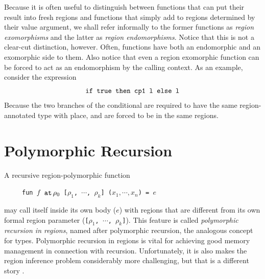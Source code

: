 \documentclass[12pt]{book}
\begin{document}
Because it is often useful to distinguish between functions that can
put their result into fresh regions and functions that simply add to
regions determined by their value argument, we shall refer informally
to the former functions as
%
{\em region exomorphisms} and the latter as
%
{\em region endomorphisms}. Notice that this is not a clear-cut
distinction, however. Often, functions have both an endomorphic and an
exomorphic side to them. Also notice that even a region exomorphic
function can be forced to act as an endomorphism by the calling
context. As an example, consider the expression
$$\hbox{\tt if true then cp1 l else l}$$
Because the two branches of the
conditional are required to have the same region-annotated type with
place,  and  are forced to be in the same
regions.

\section{Polymorphic Recursion}

\label{polyrec.sec}
A 
%
recursive region-polymorphic function
\begin{tabbing}
\ \ \ \ \ \=\tt fun $f$ $\mathbin{\hbox{\tt at}}\,\rho_0$ [$\rho_1$, $\cdots$, $\rho_k$] ($x_1,\cdots,x_n$) = $e$
\end{tabbing}
may call itself inside its own body ($e$) with regions that are different
from its own formal region parameter ({\tt [$\rho_1$, $\cdots$, $\rho_k$]}).
This feature is called {\it polymorphic recursion in regions}, named after
polymorphic recursion, the analogous concept for types.
Polymorphic recursion in regions is vital for achieving good 
memory management in connection with recursion.
Unfortunately, it is also makes  the region inference problem considerably more
challenging, but that is a different story \cite{tofbir98}.
\end{document}
